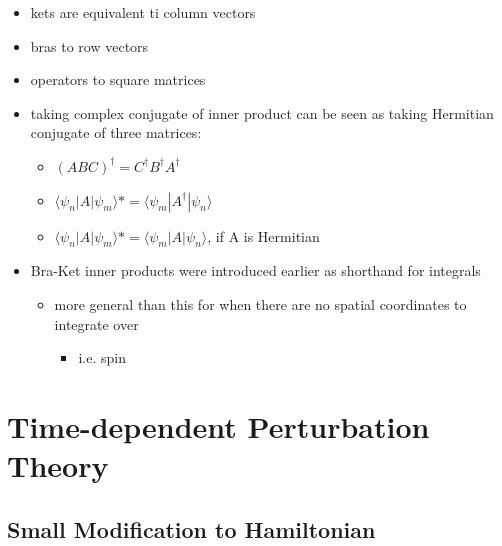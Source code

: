 \documentclass[a4paper,11pt,normalem]{article}
\begin{document}
\begin{itemize}
\item
  kets are equivalent ti column vectors
\item
  bras to row vectors
\item
  operators to square matrices
\item
  taking complex conjugate of inner product can be seen as taking
  Hermitian conjugate of three matrices:
  \begin{itemize}
  \item
    \((ABC)^{\dagger} = C^\dagger B^\dagger A^\dagger\)
  \item
    \(\langle \psi_n | A | \psi_m \rangle* = \langle \psi_m | A^\dagger | \psi_n \rangle\)
  \item
    \(\langle \psi_n | A | \psi_m \rangle* = \langle \psi_m | A | \psi_n \rangle\),
    if A is Hermitian
  \end{itemize}
\item
  Bra-Ket inner products were introduced earlier as shorthand for
  integrals
  \begin{itemize}
  \item
    more general than this for when there are no spatial coordinates to
    integrate over
    \begin{itemize}
    \item
      i.e. spin
    \end{itemize}
  \end{itemize}
\end{itemize}

\section{Time-dependent Perturbation Theory}\label{time-dependent-perturbation-theory}

\subsection{Small Modification to Hamiltonian}\label{small-modification-to-hamiltonian}
\end{document}
